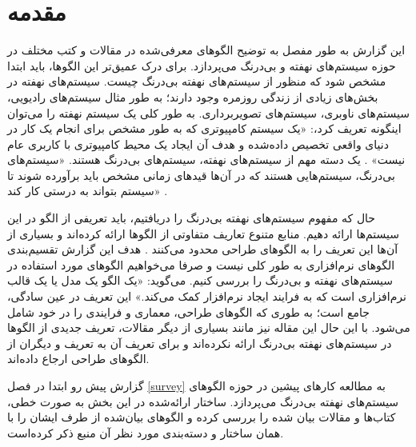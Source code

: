 \setlength\parindent{24pt}
\section{مقدمه}

\begin{RTL}
این گزارش به طور مفصل به توضیح الگوهای معرفی‌شده در مقالات و کتب مختلف
در حوزه سیستم‌های نهفته و بی‌درنگ می‌پردازد.
برای درک عمیق‌تر این الگوها، باید ابتدا مشخص شود که منظور
از سیستم‌های نهفته بی‌درنگ چیست.
سیستم‌های نهفته در بخش‌های زیادی از زندگی روزمره وجود دارند؛
به طور مثال سیستم‌های رادیویی، سیستم‌های ناوبری، سیستم‌های تصویربرداری.
به طور کلی یک سیستم نهفته را می‌توان اینگونه تعریف کرد،:
«یک سیستم کامپیوتری که به طور مشخص برای انجام یک کار در دنیای واقعی
تخصیص داده‌شده و هدف آن ایجاد یک محیط کامپیوتری
با کاربری عام نیست» \cite{ref1}.
یک دسته مهم از سیستم‌های نهفته، سیستم‌های بی‌درنگ هستند.
«سیستم‌های بی‌درنگ، سیستم‌هایی
هستند که در آن‌ها قیدهای زمانی مشخص باید برآورده شوند
تا سیستم بتواند به درستی کار کند» \cite{ref1}.
\end{RTL}

\begin{RTL}
حال که مفهوم سیستم‌های نهفته بی‌درنگ را دریافتیم، باید تعریفی از الگو در این سیستم‌ها
ارائه دهیم. منابع متنوع تعاریف متفاوتی از الگوها ارائه کرده‌اند و بسیاری از آن‌ها
این تعریف را به الگوهای طراحی محدود می‌کنند \cite{ref1}.
هدف این گزارش تقسیم‌بندی الگوهای نرم‌افزاری به طور کلی نیست و صرفا می‌خواهیم
الگوهای مورد استفاده در سیستم‌های نهفته و بی‌درنگ را بررسی کنیم.
 \cite{ref2} می‌گوید:
«یک الگو یک مدل یا یک قالب نرم‌افزاری است که به فرایند ایجاد نرم‌افزار کمک می‌کند.»
این تعریف در عین سادگی، جامع است؛ به طوری که الگوهای طراحی، معماری و فرایندی
را در خود شامل می‌شود. با این حال این مقاله نیز مانند بسیاری از دیگر مقالات،
تعریف جدیدی از الگوها در سیستم‌های نهفته بی‌درنگ ارائه نکرده‌اند و برای تعریف آن به
تعریف  و دیگران \cite{ref3} از الگوهای طراحی ارجاع داده‌اند.
\end{RTL}

\begin{RTL}
گزارش پیش رو ابتدا در فصل \ref{survey} به مطالعه کارهای
پیشین در حوزه الگوهای سیستم‌های نهفته بی‌درنگ می‌پردازد.
ساختار ارائه‌شده در این بخش به صورت خطی، کتاب‌ها و مقالات
بیان شده را بررسی کرده و الگوهای بیان‌شده از طرف ایشان را
با همان ساختار و دسته‌بندی مورد نظر آن منبع ذکر کرده‌است.
\end{RTL}


